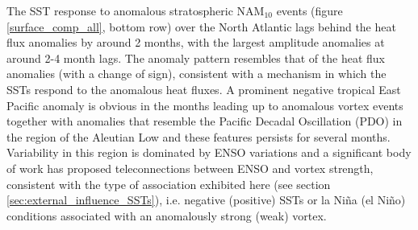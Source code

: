 The SST response to anomalous stratospheric NAM$_{10}$ events (figure \ref{surface_comp_all}, bottom row) over the North Atlantic lags behind the heat flux anomalies by around 2 months, with the largest amplitude anomalies at around 2-4 month lags.  The anomaly pattern resembles that of the heat flux anomalies (with a change of sign), consistent with a mechanism in which the SSTs respond to the anomalous heat fluxes. A prominent negative tropical East Pacific anomaly is obvious in the months leading up to anomalous vortex events together with  anomalies that resemble the Pacific Decadal Oscillation (PDO) in the region of the Aleutian Low \cite{mantuaPacific1997} and these features persists for several months. Variability in this region is dominated by ENSO variations and a significant body of work has proposed teleconnections between ENSO and vortex strength, consistent with the type of association exhibited here (see section \ref{sec:external_influence_SSTs}), i.e. negative (positive) SSTs or la Ni\~{n}a (el Ni\~{n}o) conditions associated with an anomalously strong (weak) vortex. 











